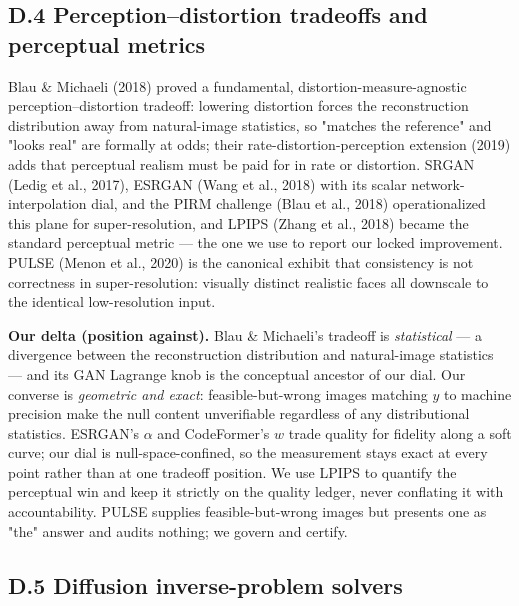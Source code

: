 \documentclass[11pt]{article}
\begin{document}
\subsection*{D.4 Perception--distortion tradeoffs and perceptual metrics}

Blau \& Michaeli (2018) proved a fundamental, distortion-measure-agnostic perception--distortion tradeoff: lowering distortion forces the reconstruction distribution away from natural-image statistics, so "matches the reference" and "looks real" are formally at odds; their rate-distortion-perception extension (2019) adds that perceptual realism must be paid for in rate or distortion. SRGAN (Ledig et al., 2017), ESRGAN (Wang et al., 2018) with its scalar network-interpolation dial, and the PIRM challenge (Blau et al., 2018) operationalized this plane for super-resolution, and LPIPS (Zhang et al., 2018) became the standard perceptual metric --- the one we use to report our locked improvement. PULSE (Menon et al., 2020) is the canonical exhibit that consistency is not correctness in super-resolution: visually distinct realistic faces all downscale to the identical low-resolution input.

\textbf{Our delta (position against).} Blau \& Michaeli's tradeoff is \textit{statistical} --- a divergence between the reconstruction distribution and natural-image statistics --- and its GAN Lagrange knob is the conceptual ancestor of our dial. Our converse is \textit{geometric and exact}: feasible-but-wrong images matching $y$ to machine precision make the null content unverifiable regardless of any distributional statistics. ESRGAN's $\alpha$ and CodeFormer's $w$ trade quality for fidelity along a soft curve; our dial is null-space-confined, so the measurement stays exact at every point rather than at one tradeoff position. We use LPIPS to quantify the perceptual win and keep it strictly on the quality ledger, never conflating it with accountability. PULSE supplies feasible-but-wrong images but presents one as "the" answer and audits nothing; we govern and certify.

\subsection*{D.5 Diffusion inverse-problem solvers}
\end{document}
